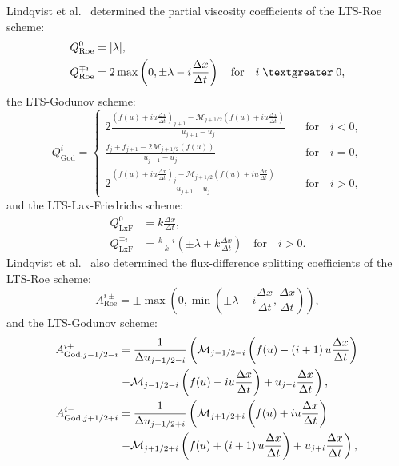 Lindqvist et al.~\cite{lin16} determined the partial viscosity coefficients of the LTS-Roe scheme:
\begin{subequations} \label{eq:scalar-LTS-Roe-NV}
\begin{align}
Q_\text{Roe}^0 & = | \lambda |, \\
Q_\text{Roe}^{\mp i} & = 2 \max \left( 0, \pm \lambda - i \frac{\Delta x}{\Delta t} \right) \quad \text{for} \quad i \; \textgreater \; 0,
\end{align}
\end{subequations}
the LTS-Godunov scheme:
\begin{equation} \label{eq:scalar-LTS-God-NV}
Q_\text{God}^i = \left\{ \begin{array}{lll}
2 \frac{\left( f(u) + iu\frac{\Delta x}{\Delta t} \right)_{j+1} - \mathcal{M}_{j+1/2}\left( f(u) + iu \frac{\Delta x}{\Delta t} \right)}{u_{j+1} - u_j} \quad & \text{for} \quad i < 0, \\[0.5em]
\frac{f_j + f_{j+1} - 2 \mathcal{M}_{j+1/2}(f(u))}{u_{j+1} - u_j}	\quad & \text{for} \quad i=0, \\[0.5em]
2 \frac{\left( f(u) + iu\frac{\Delta x}{\Delta t} \right)_{j} - \mathcal{M}_{j+1/2}\left( f(u) + iu \frac{\Delta x}{\Delta t} \right)}{u_{j+1} - u_j}	\quad & \text{for} \quad i > 0, \end{array} \right.
\end{equation}
and the LTS-Lax-Friedrichs scheme:
\begin{subequations} \label{eq:scalar-LTS-LxF-NV}
\begin{align}
Q_\text{LxF}^0 & = k \frac{\Delta x}{\Delta t}, \\
Q_\text{LxF}^{\mp i} & = \frac{k-i}{k} \left( \pm \lambda + k \frac{\Delta x}{\Delta t} \right) \quad \text{for} \quad i>0.
\end{align}
\end{subequations}
Lindqvist et al.~\cite{lin16} also determined the flux-difference splitting coefficients of the LTS-Roe scheme:
\begin{equation} \label{eq:scalar-LTS-Roe-FDS}
A_\text{Roe}^{i\pm} = \pm \max \left( 0, \min \left( \pm \lambda - i \frac{\Delta x}{\Delta t}, \frac{\Delta x}{\Delta t} \right) \right),
\end{equation}
and the LTS-Godunov scheme:
\begin{subequations} \label{eq:scalar-LTS-God-FDS}
\begin{align}
A_{\text{God},j-1/2-i}^{i+}
& = \frac{1}{\Delta u_{j-1/2-i}} \left( 
\mathcal{M}_{j-1/2-i} \left( f(u) - \left( i+1 \right) u \frac{\Delta x}{\Delta t} \right) \right. \notag \\
& \left. - 
\mathcal{M}_{j-1/2-i} \left( f(u) - iu \frac{\Delta x}{\Delta t} \right) + u_{j-i} \frac{\Delta x}{\Delta t} \right), \\
A_{\text{God},j+1/2+i}^{i-}
& = \frac{1}{\Delta u_{j+1/2+i}} \left( 
\mathcal{M}_{j+1/2+i} \left( f(u) + i u \frac{\Delta x}{\Delta t} \right) \right. \notag \\
& \left. - 
\mathcal{M}_{j+1/2+i} \left( f(u) + \left( i+1 \right)u \frac{\Delta x}{\Delta t} \right) + u_{j+i} \frac{\Delta x}{\Delta t} \right),
\end{align}
\end{subequations}
